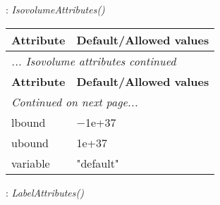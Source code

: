 \documentclass[10pt,a4paper]{report}
\begin{document}
\newpage

{}
: {\it IsovolumeAttributes() }\\[-3mm]

\begin{longtable}{ll}
{\bf Attribute} & {\bf Default/Allowed values} \\
\hline \hline
\endfirsthead
\multicolumn{2}{l}{{\it ... Isovolume attributes continued}} \\
{\bf Attribute} & {\bf Default/Allowed values} \\
\hline \hline
\endhead
\hline
\multicolumn{2}{l}{{\it Continued on next page...}} \\
\endfoot
\hline
\endlastfoot

lbound  &  $-$1e+37 \\
ubound  &  1e+37 \\
variable  &  "default" \\
\end{longtable}

\newpage

{}
: {\it LabelAttributes() }\\[-3mm]
\end{document}
